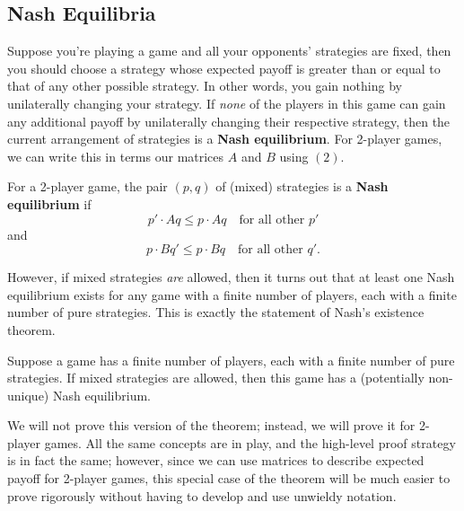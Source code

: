\documentclass[twoside,10pt]{article}
\begin{document}
\subsection{Nash Equilibria}

Suppose you're playing a game and all your opponents' strategies are fixed, then you should choose a strategy whose expected payoff is greater than or equal to that of any other possible strategy. In other words, you gain nothing by unilaterally changing your strategy. If \textit{none} of the players in this game can gain any additional payoff by unilaterally changing their respective strategy, then the current arrangement of strategies is a \textbf{Nash equilibrium}. For 2-player games, we can write this in terms our matrices $A$ and $B$ using $(2)$.

\begin{defn}[]
	For a 2-player game, the pair $(p,q)$ of (mixed) strategies is a \textbf{Nash equilibrium} if
	\[
		p' \cdot Aq \leq p \cdot Aq \quad \text{for all other } p'
	\] 
	and
	\[
                p \cdot Bq' \leq p \cdot Bq \quad \text{for all other } q'.
        \]
\end{defn}


However, if mixed strategies \textit{are} allowed, then it turns out that at least one Nash equilibrium exists for any game with a finite number of players, each with a finite number of pure strategies. This is exactly the statement of Nash's existence theorem.

\begin{thrm}
	Suppose a game has a finite number of players, each with a finite number of pure strategies. If mixed strategies are allowed, then this game has a (potentially non-unique) Nash equilibrium.
\end{thrm}

We will not prove this version of the theorem; instead, we will prove it for 2-player games. All the same concepts are in play, and the high-level proof strategy is in fact the same; however, since we can use matrices to describe expected payoff for 2-player games, this special case of the theorem will be much easier to prove rigorously without having to develop and use unwieldy notation.


\end{document}
